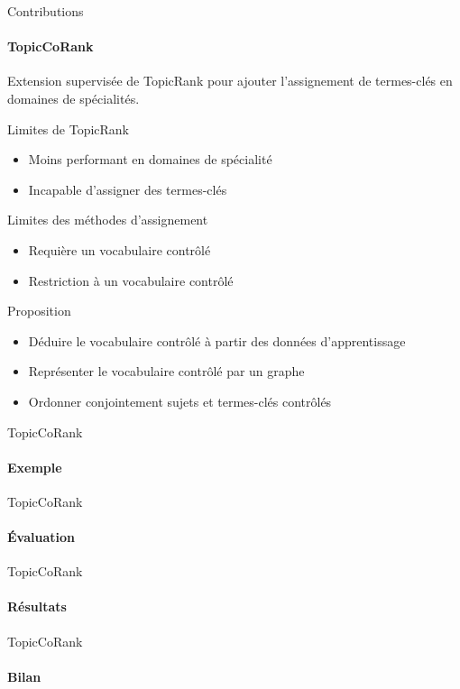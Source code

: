 \begin{frame}{Contributions}\framesubtitle{TopicCoRank}
  Extension supervisée de TopicRank pour ajouter l'assignement de termes-clés en
  domaines de spécialités.

  \begin{alertblock}{Limites de TopicRank}
    \begin{itemize}
      \item{Moins performant en domaines de spécialité}
      \item{Incapable d'assigner des termes-clés}
    \end{itemize}
  \end{alertblock}

  \begin{alertblock}{Limites des méthodes d'assignement}
    \begin{itemize}
      \item{Requière un vocabulaire contrôlé}
      \item{Restriction à un vocabulaire contrôlé}
    \end{itemize}
  \end{alertblock}

  \begin{block}{Proposition}
    \begin{itemize}
      \item{Déduire le vocabulaire contrôlé à partir des données
            d'apprentissage}
      \item{Représenter le vocabulaire contrôlé par un graphe}
      \item{Ordonner conjointement sujets et termes-clés contrôlés}
    \end{itemize}
  \end{block}
\end{frame}

\begin{frame}{TopicCoRank}\framesubtitle{Exemple}
\end{frame}

\begin{frame}{TopicCoRank}\framesubtitle{Évaluation}
\end{frame}

\begin{frame}{TopicCoRank}\framesubtitle{Résultats}
\end{frame}

\begin{frame}{TopicCoRank}\framesubtitle{Bilan}
\end{frame}

